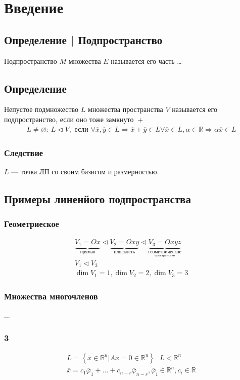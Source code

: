 \documentclass{article}
\begin{document}
\section{Введение}

\subsection{Определение | Подпространство}
Подпространство $M$ множества $E$ называется его часть
\dots

\subsection{Определение}
Непустое подмножество $L$ множества пространства $V$ называется его подпространство, если оно тоже замкнуто $\boxed{+}$
\begin{gather*}
    L \neq \varnothing: \boxed{~L \lhd V}, \text{ если } \forall \overline{x}, \overline{y} \in L \Rightarrow \overline{x} + \overline{y} \in L
    \forall \overline{x} \in L, \alpha \in \mathbb{R} \Rightarrow \alpha \overline{x} \in L
\end{gather*}
\subsubsection{Следствие}
$L$ --- точка ЛП со своим базисом и размерностью.

\subsection{Примеры линенйого подпространства}
\subsubsection{Геометриеское}
\begin{gather*}
    \underbrace{V_1 = Ox}_{\text{прямая}} \lhd \underbrace{V_2 = Oxy}_{\text{плоскость}} \lhd \underbrace{V_3 = Oxyz}_{\underset{\text{пространство}}{\text{геометрическое}}} \\
    V_1 \lhd V_3 \\
    \dim V_1 = 1, \dim V_2 = 2, \dim V_3 = 3
\end{gather*}

\subsubsection{Множества многочленов}
...

\subsubsection{3}
\begin{gather*}
    \boxed{L = \left\{ \overline{x} \in \mathbb{R}^u | A \overline{x} = \overline{0} \in \mathbb{R}^u \right\}} ~~~
    \boxed{L \lhd \mathbb{R}^n} \\
    \overline{x} = c_1 \overline{\varphi}_1 + \dots + c_{n - r} \overline{\varphi}_{n - r}, \overline{\varphi}_i \in \mathbb{R}^n, c_i \in \mathbb{R}
\end{gather*}
\end{document}
